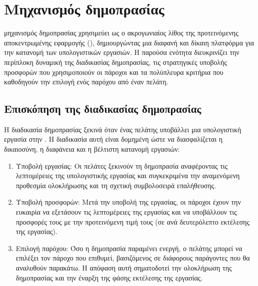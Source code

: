 \chapter{Μηχανισμός δημοπρασίας}
 μηχανισμός δημοπρασίας χρησιμεύει ως ο ακρογωνιαίος λίθος της προτεινόμενης αποκεντρωμένης εφαρμογής (), δημιουργώντας μια διαφανή και δίκαιη πλατφόρμα για την κατανομή των υπολογιστικών εργασιών. Η παρούσα ενότητα διευκρινίζει την περίπλοκη δυναμική της διαδικασίας δημοπρασίας, τις στρατηγικές υποβολής προσφορών που χρησιμοποιούν οι πάροχοι και τα πολύπλευρα κριτήρια που καθοδηγούν την επιλογή ενός παρόχου από έναν πελάτη.

\section{Επισκόπηση της διαδικασίας δημοπρασίας}
Η διαδικασία δημοπρασίας ξεκινά όταν ένας πελάτης υποβάλλει μια υπολογιστική εργασία στην . Η διαδικασία αυτή είναι δομημένη ώστε να διασφαλίζεται η δικαιοσύνη, η διαφάνεια και η βέλτιστη κατανομή εργασιών:
\begin{enumerate}
    \item Υποβολή εργασίας: Οι πελάτες ξεκινούν τη δημοπρασία αναφέροντας τις λεπτομέρειες της υπολογιστικής εργασίας και συγκεκριμένα την αναμενόμενη προθεσμία ολοκλήρωσης και τη σχετική συμβολοσειρά επαλήθευσης.
    \item Υποβολή προσφορών: Μετά την υποβολή της εργασίας, οι πάροχοι έχουν την ευκαιρία να εξετάσουν τις λεπτομέρειες της εργασίας και να υποβάλλουν τις προσφορές τους με την προτεινόμενη τιμή τους (σε  ανά δευτερόλεπτο εκτέλεσης της εργασίας).
    \item Επιλογή παρόχου: Όσο η δημοπρασία παραμένει ενεργή, ο πελάτης μπορεί να επιλέξει τον πάροχο που επιθυμεί, βασιζόμενος σε διάφορους παράγοντες που θα αναλυθούν παρακάτω. Η απόφαση αυτή σηματοδοτεί την ολοκλήρωση της δημοπρασίας και την έναρξη της φάσης εκτέλεσης της εργασίας.
\end{enumerate}

